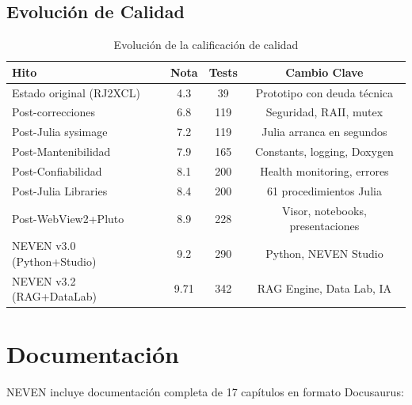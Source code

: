 \documentclass[12pt, a4paper]{report}
\begin{document}
\section{Evolución de Calidad}

\begin{table}[H]
\centering
\begin{tabular}{lccc}
\toprule
\textbf{Hito} & \textbf{Nota} & \textbf{Tests} & \textbf{Cambio Clave} \\
\midrule
Estado original (RJ2XCL) & 4.3 & 39 & Prototipo con deuda técnica \\
Post-correcciones & 6.8 & 119 & Seguridad, RAII, mutex \\
Post-Julia sysimage & 7.2 & 119 & Julia arranca en segundos \\
Post-Mantenibilidad & 7.9 & 165 & Constants, logging, Doxygen \\
Post-Confiabilidad & 8.1 & 200 & Health monitoring, errores \\
Post-Julia Libraries & 8.4 & 200 & 61 procedimientos Julia \\
Post-WebView2+Pluto & 8.9 & 228 & Visor, notebooks, presentaciones \\
NEVEN v3.0 (Python+Studio) & 9.2 & 290 & Python, NEVEN Studio \\
NEVEN v3.2 (RAG+DataLab) & 9.71 & 342 & RAG Engine, Data Lab, IA \\
\bottomrule
\end{tabular}
\caption{Evolución de la calificación de calidad}
\end{table}

\chapter{Documentación}

NEVEN incluye documentación completa de 17 capítulos en formato Docusaurus:
\end{document}
